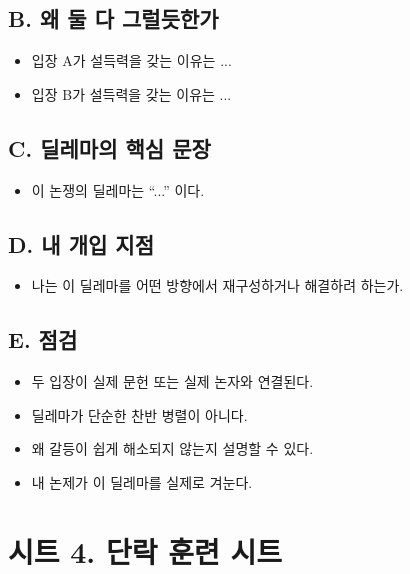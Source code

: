 \subsection{B. 왜 둘 다 그럴듯한가}\label{b-uxc65c-uxb458-uxb2e4-uxadf8uxb7f4uxb4efuxd55cuxac00}

\begin{itemize}
\tightlist
\item
  입장 A가 설득력을 갖는 이유는 ...
\item
  입장 B가 설득력을 갖는 이유는 ...
\end{itemize}

\subsection{C. 딜레마의 핵심 문장}\label{c-uxb51cuxb808uxb9c8uxc758-uxd575uxc2ec-uxbb38uxc7a5}

\begin{itemize}
\tightlist
\item
  이 논쟁의 딜레마는 ``...'' 이다.
\end{itemize}

\subsection{D. 내 개입 지점}\label{d-uxb0b4-uxac1cuxc785-uxc9c0uxc810}

\begin{itemize}
\tightlist
\item
  나는 이 딜레마를 어떤 방향에서 재구성하거나 해결하려 하는가.
\end{itemize}

\subsection{E. 점검}\label{e-uxc810uxac80}

\begin{itemize}
\tightlist
\item[$\square$]
  두 입장이 실제 문헌 또는 실제 논자와 연결된다.
\item[$\square$]
  딜레마가 단순한 찬반 병렬이 아니다.
\item[$\square$]
  왜 갈등이 쉽게 해소되지 않는지 설명할 수 있다.
\item[$\square$]
  내 논제가 이 딜레마를 실제로 겨눈다.
\end{itemize}

\section{시트 4. 단락 훈련 시트}\label{uxc2dcuxd2b8-4-uxb2e8uxb77d-uxd6c8uxb828-uxc2dcuxd2b8}

